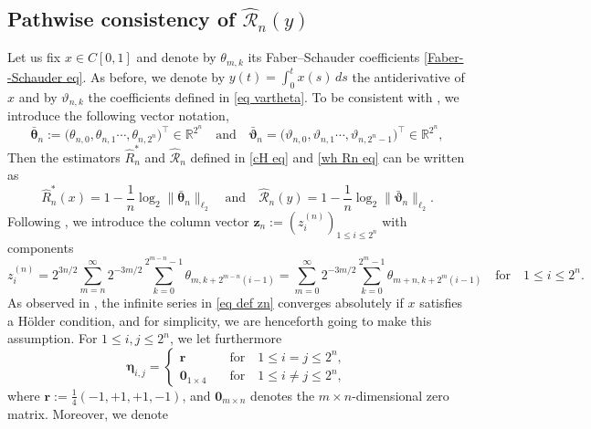 \documentclass[12pt,reqno]{article}
\def\wh{\widehat}
\numberwithin{equation}{section}
\def\cR{{\mathscr R}}
\theoremstyle{definition}
\def\wh{\widehat}
\newcommand{\bR}{\mathbb{R}}
\begin{document}
\subsection{Pathwise consistency of $\wh\cR_n(y)$}\label{pathwise section}

Let us fix $x \in C[0,1]$ and denote by  $\theta_{m,k}$  its  Faber--Schauder coefficients \eqref{Faber--Schauder eq}. As before, we denote by $y(t)=\int_0^tx(s)\,ds$ the antiderivative of $x$ and by $\vartheta_{n,k}$ the coefficients defined in \eqref{eq vartheta}. To be consistent with   \cite{HanSchiedMatrix}, we introduce the following vector notation,
	\begin{equation}\label{eq vector}
\bar{\bm \theta}_n := \big(\theta_{n,0}, \theta_{n,1} \cdots, \theta_{n,2^{n}}\big)^\top \in \bR^{2^{n}}\quad \text{and} \quad \bar{\bm \vartheta}_n = \big(\vartheta_{n,0}, \vartheta_{n,1} \cdots, \vartheta_{n,2^{n}-1}\big)^\top \in \bR^{2^{n}},
\end{equation}
Then the estimators $\wh R^*_n$ and $\wh\cR_n$ defined in \eqref{cH eq} and \eqref{wh Rn eq} can be written as
\begin{equation}\label{Rn* and cRn eq}
\wh R_n^*(x)=1-\frac1{n}\log_2\|\bar{\bm \theta}_n\|_{\ell_2}\quad\text{and}\quad\wh\cR_n(y)=1-\frac1{n}\log_2\|\bar{\bm \vartheta}_n\|_{\ell_2}.
\end{equation}
Following  \cite{HanSchiedMatrix}, we introduce the column vector $\bm z_n:= (z^{(n)}_i)_{1 \le i \le 2^n}$ with components
\begin{equation}\label{eq def zn}
z^{(n)}_i = 2^{3n/2}\sum_{m = n}^{\infty}2^{-3m/2}\sum_{k = 0}^{2^{m-n}-1}\theta_{m,k+2^{m-n}(i-1)} = \sum_{m = 0}^{\infty}2^{-3m/2}\sum_{k = 0}^{2^{m}-1}\theta_{m+n,k+2^{m}(i-1)} \quad \text{for} \quad 1 \le i \le 2^n.
\end{equation} 
As observed in \cite{HanSchiedMatrix}, the infinite series in \eqref{eq def zn} converges absolutely if $x$ satisfies a H\"older condition, and for simplicity, we are henceforth going to make this assumption.
For $1 \le i,j \le 2^n$, we let furthermore
\begin{equation}\label{etaij def}
\bm \eta_{i,j} = \begin{cases}
\bm r &\quad \text{for} \quad 1 \le i = j \le 2^n,\\
\bm 0_{1 \times 4}  &\quad \text{for} \quad 1 \le i \neq j \le 2^n,
\end{cases}
\end{equation}
where $\bm r := \frac14(-1,+1,+1,-1)$,   and $\bm 0_{m \times n}$ denotes the $m \times n$-dimensional zero matrix. Moreover, we denote 
\end{document}
